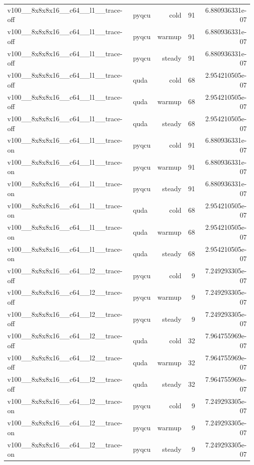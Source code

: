 \begin{table}[htbp]
\begin{tabular}{@{}llrrr@{}}
v100\_\_8x8x8x16\_\_c64\_\_l1\_\_trace-off & pyqcu & cold & 91 & 6.880936331e-07 \\
v100\_\_8x8x8x16\_\_c64\_\_l1\_\_trace-off & pyqcu & warmup & 91 & 6.880936331e-07 \\
v100\_\_8x8x8x16\_\_c64\_\_l1\_\_trace-off & pyqcu & steady & 91 & 6.880936331e-07 \\
v100\_\_8x8x8x16\_\_c64\_\_l1\_\_trace-off & quda & cold & 68 & 2.954210505e-07 \\
v100\_\_8x8x8x16\_\_c64\_\_l1\_\_trace-off & quda & warmup & 68 & 2.954210505e-07 \\
v100\_\_8x8x8x16\_\_c64\_\_l1\_\_trace-off & quda & steady & 68 & 2.954210505e-07 \\
v100\_\_8x8x8x16\_\_c64\_\_l1\_\_trace-on & pyqcu & cold & 91 & 6.880936331e-07 \\
v100\_\_8x8x8x16\_\_c64\_\_l1\_\_trace-on & pyqcu & warmup & 91 & 6.880936331e-07 \\
v100\_\_8x8x8x16\_\_c64\_\_l1\_\_trace-on & pyqcu & steady & 91 & 6.880936331e-07 \\
v100\_\_8x8x8x16\_\_c64\_\_l1\_\_trace-on & quda & cold & 68 & 2.954210505e-07 \\
v100\_\_8x8x8x16\_\_c64\_\_l1\_\_trace-on & quda & warmup & 68 & 2.954210505e-07 \\
v100\_\_8x8x8x16\_\_c64\_\_l1\_\_trace-on & quda & steady & 68 & 2.954210505e-07 \\
v100\_\_8x8x8x16\_\_c64\_\_l2\_\_trace-off & pyqcu & cold & 9 & 7.249293305e-07 \\
v100\_\_8x8x8x16\_\_c64\_\_l2\_\_trace-off & pyqcu & warmup & 9 & 7.249293305e-07 \\
v100\_\_8x8x8x16\_\_c64\_\_l2\_\_trace-off & pyqcu & steady & 9 & 7.249293305e-07 \\
v100\_\_8x8x8x16\_\_c64\_\_l2\_\_trace-off & quda & cold & 32 & 7.964755969e-07 \\
v100\_\_8x8x8x16\_\_c64\_\_l2\_\_trace-off & quda & warmup & 32 & 7.964755969e-07 \\
v100\_\_8x8x8x16\_\_c64\_\_l2\_\_trace-off & quda & steady & 32 & 7.964755969e-07 \\
v100\_\_8x8x8x16\_\_c64\_\_l2\_\_trace-on & pyqcu & cold & 9 & 7.249293305e-07 \\
v100\_\_8x8x8x16\_\_c64\_\_l2\_\_trace-on & pyqcu & warmup & 9 & 7.249293305e-07 \\
v100\_\_8x8x8x16\_\_c64\_\_l2\_\_trace-on & pyqcu & steady & 9 & 7.249293305e-07 \\

\end{tabular}
\end{table}
